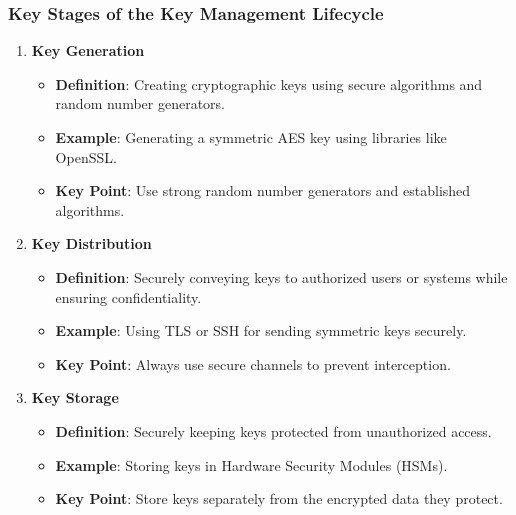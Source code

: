 \documentclass{beamer}
\begin{document}
\begin{frame}[fragile]
    \frametitle{Key Stages of the Key Management Lifecycle}
    \begin{enumerate}
        \item \textbf{Key Generation}
            \begin{itemize}
                \item \textbf{Definition}: Creating cryptographic keys using secure algorithms and random number generators.
                \item \textbf{Example}: Generating a symmetric AES key using libraries like OpenSSL.
                \item \textbf{Key Point}: Use strong random number generators and established algorithms.
            \end{itemize}

        \item \textbf{Key Distribution}
            \begin{itemize}
                \item \textbf{Definition}: Securely conveying keys to authorized users or systems while ensuring confidentiality.
                \item \textbf{Example}: Using TLS or SSH for sending symmetric keys securely.
                \item \textbf{Key Point}: Always use secure channels to prevent interception.
            \end{itemize}

        \item \textbf{Key Storage}
            \begin{itemize}
                \item \textbf{Definition}: Securely keeping keys protected from unauthorized access.
                \item \textbf{Example}: Storing keys in Hardware Security Modules (HSMs).
                \item \textbf{Key Point}: Store keys separately from the encrypted data they protect.
            \end{itemize}
    \end{enumerate}
\end{frame}
\end{document}
